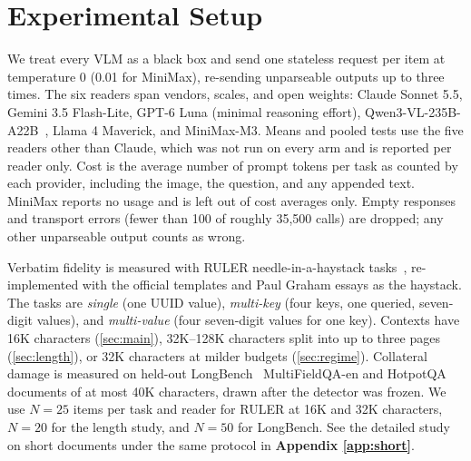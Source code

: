 \section{Experimental Setup}
\label{sec:setup}

We treat every VLM as a black box and send one stateless request per item at temperature 0 (0.01 for MiniMax), re-sending unparseable outputs up to three times.
The six readers span vendors, scales, and open weights: Claude Sonnet 5.5, Gemini 3.5 Flash-Lite, GPT-6 Luna (minimal reasoning effort), Qwen3-VL-235B-A22B~\cite{bai2025qwen3vl}, Llama 4 Maverick, and MiniMax-M3.
Means and pooled tests use the five readers other than Claude, which was not run on every arm and is reported per reader only.
Cost is the average number of prompt tokens per task as counted by each provider, including the image, the question, and any appended text. MiniMax reports no usage and is left out of cost averages only.
Empty responses and transport errors (fewer than 100 of roughly 35{,}500 calls) are dropped; any other unparseable output counts as wrong.

Verbatim fidelity is measured with RULER needle-in-a-haystack tasks~\cite{hsieh2024ruler}, re-implemented with the official templates and Paul Graham essays as the haystack.
The tasks are \emph{single} (one UUID value), \emph{multi-key} (four keys, one queried, seven-digit values), and \emph{multi-value} (four seven-digit values for one key).
Contexts have 16K characters (\cref{sec:main}), 32K--128K characters split into up to three pages (\cref{sec:length}), or 32K characters at milder budgets (\cref{sec:regime}).
Collateral damage is measured on held-out LongBench~\cite{bai2024longbench} MultiFieldQA-en and HotpotQA documents of at most 40K characters, drawn after the detector was frozen.
We use $N=25$ items per task and reader for RULER at 16K and 32K characters, $N=20$ for the length study, and $N=50$ for LongBench. %
See the detailed study on short documents under the same protocol in \textbf{Appendix \ref{app:short}}.

